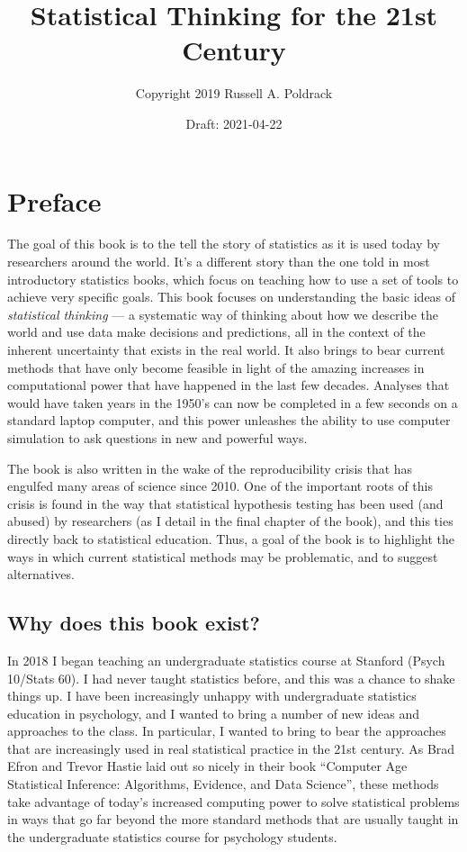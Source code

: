 \documentclass[12pt,]{book}
\title{Statistical Thinking for the 21st Century}
\author{Copyright 2019 Russell A. Poldrack}
\date{Draft: 2021-04-22}
\theoremstyle{definition}
\theoremstyle{definition}
\theoremstyle{definition}
\theoremstyle{remark}
\begin{document}
\maketitle

{
\setcounter{tocdepth}{1}
\tableofcontents
}
\hypertarget{preface}{%
\chapter*{Preface}\label{preface}}

The goal of this book is to the tell the story of statistics as it is used today by researchers around the world. It's a different story than the one told in most introductory statistics books, which focus on teaching how to use a set of tools to achieve very specific goals. This book focuses on understanding the basic ideas of \emph{statistical thinking} --- a systematic way of thinking about how we describe the world and use data make decisions and predictions, all in the context of the inherent uncertainty that exists in the real world. It also brings to bear current methods that have only become feasible in light of the amazing increases in computational power that have happened in the last few decades. Analyses that would have taken years in the 1950's can now be completed in a few seconds on a standard laptop computer, and this power unleashes the ability to use computer simulation to ask questions in new and powerful ways.

The book is also written in the wake of the reproducibility crisis that has engulfed many areas of science since 2010. One of the important roots of this crisis is found in the way that statistical hypothesis testing has been used (and abused) by researchers (as I detail in the final chapter of the book), and this ties directly back to statistical education. Thus, a goal of the book is to highlight the ways in which current statistical methods may be problematic, and to suggest alternatives.

\hypertarget{why-does-this-book-exist}{%
\section{Why does this book exist?}\label{why-does-this-book-exist}}

In 2018 I began teaching an undergraduate statistics course at Stanford (Psych 10/Stats 60). I had never taught statistics before, and this was a chance to shake things up. I have been increasingly unhappy with undergraduate statistics education in psychology, and I wanted to bring a number of new ideas and approaches to the class. In particular, I wanted to bring to bear the approaches that are increasingly used in real statistical practice in the 21st century. As Brad Efron and Trevor Hastie laid out so nicely in their book ``Computer Age Statistical Inference: Algorithms, Evidence, and Data Science'', these methods take advantage of today's increased computing power to solve statistical problems in ways that go far beyond the more standard methods that are usually taught in the undergraduate statistics course for psychology students.
\end{document}
